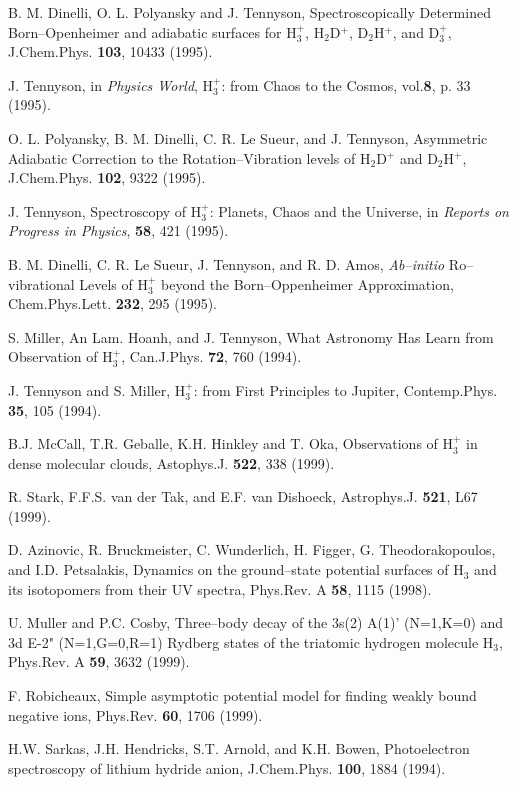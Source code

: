 \begin{thebibliography}{999}
B. M. Dinelli, O. L. Polyansky and J. Tennyson, 
Spectroscopically Determined Born--Openheimer and
adiabatic surfaces for 
H$_3^+$, H$_2$D$^+$, D$_2$H$^+$, and D$_3^+$,
J.Chem.Phys. {\bf 103},
10433 (1995).

J. Tennyson, in {\em Physics World}, 
H$_3^+$: from Chaos to the Cosmos,
vol.{\bf 8}, p. 33 (1995).

O. L. Polyansky, B. M. Dinelli, C. R. Le Sueur, and J. Tennyson,
Asymmetric Adiabatic Correction to the Rotation--Vibration levels
of H$_2$D$^+$ and D$_2$H$^+$,
J.Chem.Phys. {\bf 102}, 9322 (1995).

J. Tennyson, 
Spectroscopy of H$_3^+$: Planets, Chaos and the Universe,
in {\em Reports on Progress in Physics}, {\bf 58},
421 (1995).

B. M. Dinelli, C. R. Le Sueur, J. Tennyson, and R. D. Amos,
{\it Ab--initio} Ro--vibrational Levels of H$_3^+$ beyond the
Born--Oppenheimer Approximation,
Chem.Phys.Lett. {\bf 232}, 295 (1995).

S. Miller, An Lam. Hoanh, and J. Tennyson,
What Astronomy Has Learn from Observation of H$_3^+$,
Can.J.Phys. {\bf 72}, 760 (1994).

J. Tennyson and S. Miller, 
H$_3^+$: from First Principles to Jupiter,
Contemp.Phys. {\bf 35}, 105 (1994).

B.J. McCall, T.R. Geballe, K.H. Hinkley and T. Oka,
Observations of H$_3^+$ in dense molecular clouds,
Astophys.J. {\bf 522}, 338 (1999).

R. Stark, F.F.S. van der Tak, and E.F. van Dishoeck,
Astrophys.J. {\bf 521}, L67 (1999).

D. Azinovic, R. Bruckmeister, C. Wunderlich, H. Figger,
G. Theodorakopoulos, and I.D. Petsalakis,
Dynamics on the ground--state potential surfaces of H$_3$
and its isotopomers from their UV spectra,
Phys.Rev. A {\bf 58}, 1115 (1998).

U. Muller and P.C. Cosby,
Three--body decay of the 3s(2) A(1)' (N=1,K=0) and 3d E-2"
(N=1,G=0,R=1) Rydberg states of the triatomic hydrogen
molecule H$_3$,
Phys.Rev. A {\bf 59}, 3632 (1999).

F. Robicheaux,
Simple asymptotic potential model for finding
weakly bound negative ions,
Phys.Rev. {\bf 60}, 1706 (1999).

H.W. Sarkas, J.H. Hendricks, S.T. Arnold, and K.H. Bowen,
Photoelectron spectroscopy of lithium hydride anion,
J.Chem.Phys. {\bf 100}, 1884 (1994).


\end{thebibliography}
